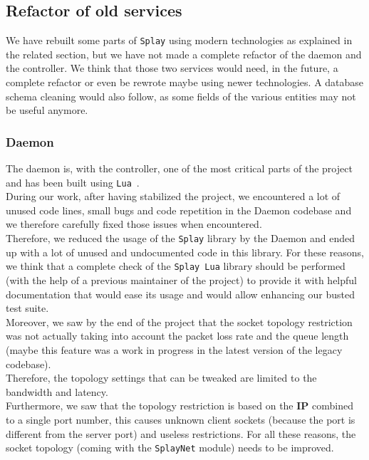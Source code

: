 \documentclass{eplmastersthesis}
\begin{document}
      \subsection{Refactor of old services}

        We have rebuilt some parts of \texttt{Splay} using modern technologies as
        explained in the related section, but we have not made a complete
        refactor of the daemon and the controller. We think that those two
        services would need, in the future, a complete refactor or even be
        rewrote maybe using newer technologies. A database schema cleaning
        would also follow, as some fields of the various entities may not be
        useful anymore.

        \subsubsection{Daemon}

          The daemon is, with the controller, one of the most critical parts of
          the project and has been built using \texttt{Lua}~\cite{Lua}.\\
          During our work, after having stabilized the project, we encountered
          a lot of unused code lines, small bugs and code repetition in the
          Daemon codebase and we therefore carefully fixed those issues when
          encountered.\\
          Therefore, we reduced the usage of the \texttt{Splay} library by the Daemon
          and ended up with a lot of unused and undocumented code in this
          library. For these reasons, we think that a complete check of the
          \texttt{Splay Lua} library should be performed (with the help of a previous
          maintainer of the project) to provide it with helpful documentation
          that would ease its usage and would allow enhancing our busted test
          suite.\\

          Moreover, we saw by the end of the project that the socket
          topology restriction was not actually taking into account
          the packet loss rate and the queue length (maybe this feature was
          a work in progress in the latest version of the legacy codebase).\\
          Therefore, the topology settings that can be tweaked are limited to
          the bandwidth and latency.\\
          Furthermore, we saw that the topology restriction is based on the
          \textbf{IP} combined to a single port number, this causes unknown
          client sockets (because the port is different from the server port)
          and useless restrictions. For all these reasons, the socket topology
          (coming with the \texttt{SplayNet} module) needs to be improved.\\
\end{document}
